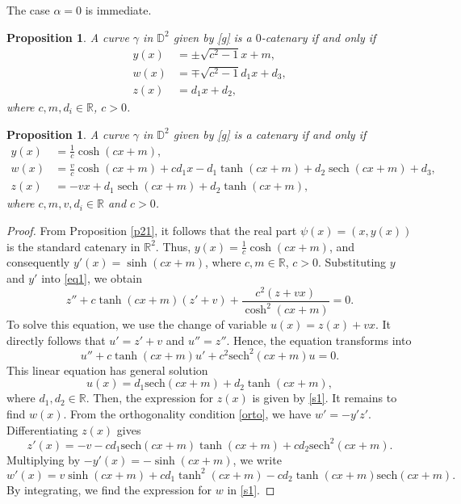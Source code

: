 \documentclass[a4paper,12pt]{amsart}
\newtheorem{proposition}[theorem]{Proposition}
\theoremstyle{definition}
\DeclareMathOperator{\sech}{sech}
\def\r{\mathbb R}
\def\d{\mathsf d}
\def\d{\mathbb D}
\begin{document}
The case $\alpha=0$ is immediate.

\begin{proposition} \label{p23}
A curve $\gamma $ in $\d^2$     given by \eqref{g} is a $0$-catenary if and only if 
\begin{equation*}
\begin{split}
y(x)&=\pm\sqrt{c^2-1}x+m,\\
w(x)&=\mp\sqrt{c^2-1}d_1 x+d_3,\\
z(x)&= d_1x+d_2 ,
\end{split}
\end{equation*}
where $ c,m,d_i\in\r$, $c>0$.
 
\end{proposition}

 
 \begin{proposition} \label{p24}
A curve $\gamma $ in $\d^2$  given by \eqref{g} is a catenary if and only if 
\begin{equation}
\begin{split}\label{s1}
y(x)&=\frac{1}{c}\cosh(cx+m),\\
w(x)&=\frac{v}{c}\cosh(cx+m) + c d_1 x - d_1 \tanh(cx+m) + d_2 \sech(cx+m) + d_3,\\
z(x)&=-vx + d_1 \sech(cx+m) + d_2 \tanh(cx+m),
\end{split}
\end{equation}
where $c, m, v, d_i \in \r$ and $c>0$.
\end{proposition}

\begin{proof}
From Proposition \ref{p21}, it follows that the real part  $\psi(x)=(x,y(x))$ is the standard catenary in $\r^2$. Thus, $y(x) = \frac{1}{c}\cosh(cx+m)$, and consequently $y'(x) = \sinh(cx+m)$, where $c,m\in \r$, $c>0$. Substituting $y$ and $y'$ into   \eqref{eq1}, we obtain 
$$
z'' +  c \tanh(cx+m) (z'+v) + \frac{c^2(z+vx)}{\cosh^2(cx+m)} = 0.
$$
To solve this equation, we use the change of variable $u(x) = z(x) + vx$. It directly follows that $u' = z' + v$ and $u'' = z''$. Hence, the equation transforms into  
$$
u'' + c \tanh(cx+m) u' + c^2 \text{sech}^2(cx+m) u = 0.
$$
This linear equation has general solution
$$
u(x) = d_1 \text{sech}(cx+m) + d_2 \tanh(cx+m),
$$
where $d_1, d_2 \in \r$. Then,  the   expression for $z(x)$ is given by  \eqref{s1}. It remains to find $w(x)$. From the orthogonality condition \eqref{orto}, we have $w' = -y'z'$. Differentiating $z(x)$ gives
$$
z'(x) = -v - c d_1 \text{sech}(cx+m)\tanh(cx+m) + c d_2 \text{sech}^2(cx+m).
$$
Multiplying by $-y'(x) = -\sinh(cx+m)$, we write
$$
w'(x) = v \sinh(cx+m) + c d_1 \tanh^2(cx+m) - c d_2 \tanh(cx+m)\text{sech}(cx+m).
$$
By integrating, we find the expression for $w$ in \eqref{s1}. 
\end{proof}
 
\end{document}
